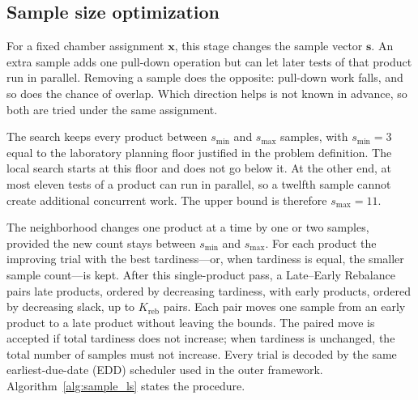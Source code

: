 \subsection{Sample size optimization}
\label{subsec:sample_optimization}

For a fixed chamber assignment \(\mathbf{x}\), this stage changes the
sample vector \(\mathbf{s}\).
An extra sample adds one pull-down operation but can let later tests
of that product run in parallel.
Removing a sample does the opposite: pull-down work falls, and so
does the chance of overlap.
Which direction helps is not known in advance, so both are tried
under the same assignment.

The search keeps every product between \(s_{\min}\) and \(s_{\max}\)
samples, with \(s_{\min}=3\) equal to the laboratory planning floor
justified in the problem definition.
The local search starts at this floor and does not go below it.
At the other end, at most eleven tests of a product can run in
parallel, so a twelfth sample cannot create additional concurrent
work.
The upper bound is therefore \(s_{\max}=11\).

The neighborhood changes one product at a time by one or two
samples, provided the new count stays between \(s_{\min}\) and
\(s_{\max}\).
For each product the improving trial with the best tardiness---or,
when tardiness is equal, the smaller sample count---is kept.
After this single-product pass, a Late--Early Rebalance pairs late
products, ordered by decreasing tardiness, with early products,
ordered by decreasing slack, up to \(K_{\mathrm{reb}}\) pairs.
Each pair moves one sample from an early product to a late product
without leaving the bounds.
The paired move is accepted if total tardiness does not increase;
when tardiness is unchanged, the total number of samples must not
increase.
Every trial is decoded by the same earliest-due-date (EDD)
scheduler used in the outer framework.
Algorithm~\ref{alg:sample_ls} states the procedure.

